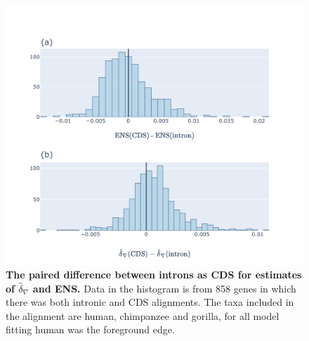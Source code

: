 \begin{figure}[htbp]
\centering
\includegraphics[width=\textwidth]{figures/plots/primate/d-conv-diff.pdf}
\caption{\textbf{The paired difference between introns as CDS for estimates of $\hat\delta_\nabla$ and ENS.} Data in the histogram is from 858 genes in which there was both intronic and CDS alignments. The taxa included in the alignment are human, chimpanzee and gorilla, for all model fitting human was the foreground edge.}
\label{fig:primate:dconv-diff}
\end{figure}
